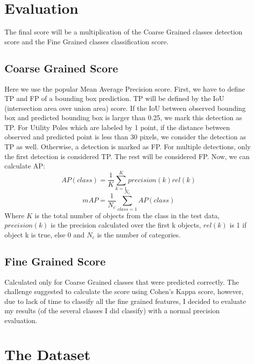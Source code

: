 \documentclass[]{article}
\begin{document}
\section{Evaluation}
The final score will be a multiplication of the Coarse Grained classes detection score and the Fine Grained classes classification score.

\subsection{Coarse Grained Score}
Here we use the popular Mean Average Precision score. First, we have to define TP and FP of a bounding box prediction. TP will be defined by the IoU (intersection area over union area) score. If the IoU between observed bounding box and predicted bounding box is larger than 0.25, we mark this detection as TP. For Utility Poles which are labeled by 1 point, if the distance between observed and predicted point is less than 30 pixels, we consider the detection as TP as well. Otherwise, a detection is marked as FP. For multiple detections, only the first detection is considered TP. The rest will be considered FP. Now, we can calculate AP:\\
$$AP(class)=\frac{1}{K}\sum_{k=1}^{K}precision(k)rel(k)$$
$$mAP=\frac{1}{N_c}\sum_{class=1}^{N_c}AP(class)$$
Where $K$ is the total number of objects from the class in the test data, $precision(k)$ is the precision calculated over the first k objects, $rel(k)$ is 1 if object k is true, else 0 and $N_c$ is the number of categories.

\subsection{Fine Grained Score}
Calculated only for Coarse Grained classes that were predicted correctly.
The challenge suggested to calculate the score using Cohen's Kappa score, however, due to lack of time to classify all the fine grained features, I decided to evaluate my results (of the several classes I did classify) with a normal precision evaluation.

\section{The Dataset}
\end{document}

